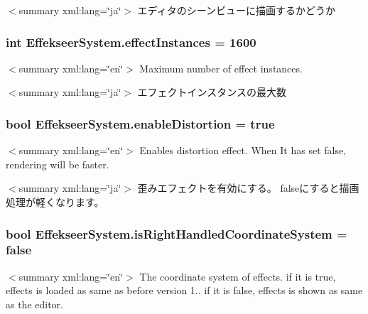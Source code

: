 $<$summary xml\-:lang=\char`\"{}ja\char`\"{}$>$ エディタのシーンビューに描画するかどうか \hypertarget{class_effekseer_system_a0516609db2194d83016f439b93510f21}{
\subsubsection[{effect\-Instances}]{\setlength{\rightskip}{0pt plus 5cm}int Effekseer\-System.\-effect\-Instances = 1600}}\label{class_effekseer_system_a0516609db2194d83016f439b93510f21}
$<$summary xml\-:lang=\char`\"{}en\char`\"{}$>$ Maximum number of effect instances. 

$<$summary xml\-:lang=\char`\"{}ja\char`\"{}$>$ エフェクトインスタンスの最大数 \hypertarget{class_effekseer_system_ad8a639d37912d6a3ada4ba5a065a7493}{
\subsubsection[{enable\-Distortion}]{\setlength{\rightskip}{0pt plus 5cm}bool Effekseer\-System.\-enable\-Distortion = true}}\label{class_effekseer_system_ad8a639d37912d6a3ada4ba5a065a7493}
$<$summary xml\-:lang=\char`\"{}en\char`\"{}$>$ Enables distortion effect. When It has set false, rendering will be faster. 

$<$summary xml\-:lang=\char`\"{}ja\char`\"{}$>$ 歪みエフェクトを有効にする。 falseにすると描画処理が軽くなります。 \hypertarget{class_effekseer_system_a106a9e679535bdacd968ab94c421321e}{
\subsubsection[{is\-Right\-Handled\-Coordinate\-System}]{\setlength{\rightskip}{0pt plus 5cm}bool Effekseer\-System.\-is\-Right\-Handled\-Coordinate\-System = false}}\label{class_effekseer_system_a106a9e679535bdacd968ab94c421321e}
$<$summary xml\-:lang=\char`\"{}en\char`\"{}$>$ The coordinate system of effects. if it is true, effects is loaded as same as before version 1.. if it is false, effects is shown as same as the editor. 

